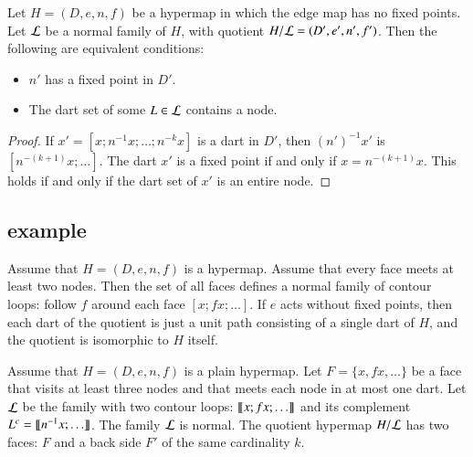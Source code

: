 \begin{lemma}\label{lemma:nfp}
Let $H=(D,e,n,f)$ be a hypermap in which the edge map has no fixed points.
Let ${\cal  L}$ be a normal family of $H$, with quotient $H/{\cal L} = (D',e',n',f')$.  
Then the following are equivalent conditions:
\begin{itemize}
\item $n'$ has a fixed point in $D'$.
\item The dart set of some $L\in {\cal L}$ contains a node.
\end{itemize}
\end{lemma}

\begin{proof}
If $x'=[x;n^{-1} x;\ldots;n^{-k} x]$ is a dart in $D'$, then $(n')^{-1}x'$ is
$[n^{-(k+1)} x;\ldots]$.  The dart $x'$ is a fixed point if and only if
$x = n^{-(k+1)} x$.  This holds if and only if the dart set of $x'$ is an entire node.
\end{proof}

\subsection{example}

\begin{example}\label{ex:Hall} 
  Assume that $H=(D,e,n,f)$ is a
  hypermap. %
  Assume that every face meets at least two nodes. Then the set of all
  faces defines a normal family of contour loops: follow $f$ around
  each face $[x;f x;\ldots]$.  If $e$ acts without fixed points, then
  each dart of the quotient is just a unit path consisting of a single
  dart of $H$, and the quotient is isomorphic to $H$ itself.
\end{example}

\begin{example}\label{ex:H2} 
  Assume that $H=(D,e,n,f)$ is a plain hypermap.  Let $F = \{x,f x,\ldots\}$ be a face
  that visits at least three nodes and that meets each node in at most
  one dart.  Let $\cal L$ be the family with two contour loops: ${\llbracket{x;f x;\ldots}\rrbracket}$ 
and its complement $L^c = {\llbracket{n^{-1} x;\ldots}\rrbracket}$.
The family $\cal L$ is normal. The quotient hypermap $H/{\cal L}$ has
two faces: $F$ and a back side $F'$ of the same cardinality $k$.
%
\end{example}

